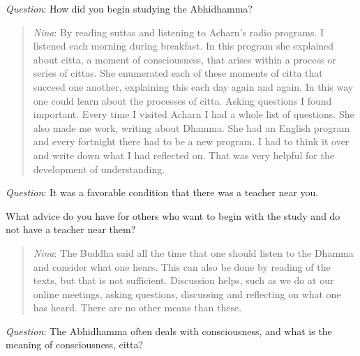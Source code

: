 \documentclass[10pt,a4paper,oneside]{article}
\begin{document}
\textit{Question}: How did you begin studying the Abhidhamma?
\begin{quote}


\textit{Nina}: By reading suttas and listening to Acharn’s radio programs. I listened each morning during breakfast. In this program she explained about citta, a moment of consciousness, that arises within a process or series of cittas. She enumerated each of these moments of citta that succeed one another, explaining this each day again and again. In this way one could learn about the processes of citta. 
Asking questions I found important. Every time I visited Acharn I had a whole list of questions. She also made me work, writing about Dhamma. She had an English program and every fortnight there had to be a new program. I had to think it over and write down what I had reflected on. That was very helpful for the development of understanding. 
\end{quote}

\textit{Question}: It was a favorable condition that there was a teacher near you. 

What advice do you have for others who want to begin with the study and do not have a teacher near them?

\begin{quote}


\textit{Nina}: The Buddha said all the time that one should listen to the Dhamma and consider what one hears. This can also be done by reading of the texts, but that is not sufficient. Discussion helps, such as we do at our online meetings, asking questions, discussing and reflecting on what one has heard. There are no other means than these. 
\end{quote}

\textit{Question}: The Abhidhamma often deals with consciousness, and what is the meaning of consciousness, citta?
\end{document}
